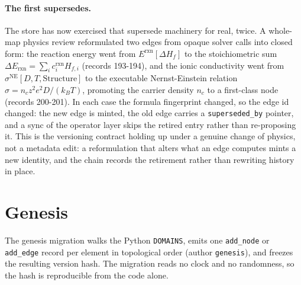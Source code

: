 \documentclass[11pt,a4paper]{article}
\begin{document}
\paragraph{The first supersedes.} The store has now exercised that supersede
machinery for real, twice. A whole-map physics review reformulated two edges from
opaque solver calls into closed form: the reaction energy went from
$E^{\mathrm{rxn}}[\Delta H_f]$ to the stoichiometric sum
$\Delta E_{\mathrm{rxn}} = \sum_i c^{\mathrm{rxn}}_i H_{f,i}$ (records 193-194),
and the ionic conductivity went from $\sigma^{\mathrm{NE}}[D, T, \mathrm{Structure}]$
to the executable Nernst-Einstein relation
$\sigma = n_c z^2 e^2 D / (k_B T)$, promoting the carrier density $n_c$ to a
first-class node (records 200-201). In each case the formula fingerprint changed,
so the edge id changed: the new edge is minted, the old edge carries a
\texttt{superseded\_by} pointer, and a sync of the operator layer skips the
retired entry rather than re-proposing it. This is the versioning contract holding
up under a genuine change of physics, not a metadata edit: a reformulation that
alters what an edge computes mints a new identity, and the chain records the
retirement rather than rewriting history in place.

\section{Genesis}
\label{sec:kernel-genesis}

The genesis migration walks the Python \texttt{DOMAINS}, emits one
\texttt{add\_node} or \texttt{add\_edge} record per element in topological order
(author \texttt{genesis}), and freezes the resulting version hash. The migration
reads no clock and no randomness, so the hash is reproducible from the code alone.
\end{document}
